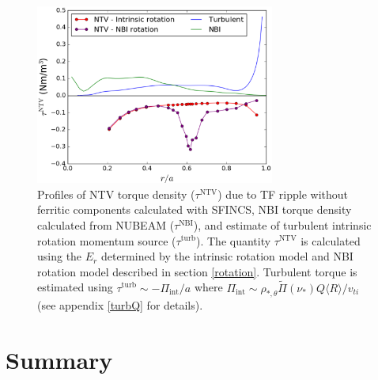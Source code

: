 \documentclass[aip, pop, preprint]{revtex4-1}
\begin{document}
\begin{figure}[h!]
\centering
\includegraphics[width=0.7\textwidth]{figure10.eps}
\caption{\label{fig:alltorque} Profiles of NTV torque density ($\tau^{\mathrm{NTV}}$) due to TF ripple without ferritic components calculated with SFINCS, NBI torque density calculated from NUBEAM ($\tau^{\mathrm{NBI}}$), and estimate of turbulent intrinsic rotation momentum source ($\tau^{\mathrm{turb}}$). The quantity $\tau^{\mathrm{NTV}}$ is calculated using the $E_r$ determined by the intrinsic rotation model and NBI rotation model described in section \ref{rotation}. Turbulent torque is estimated using $\tau^{\mathrm{turb}} \sim -\Pi_{\mathrm{int}}/a$ where $\Pi_{\mathrm{int}} \sim \rho_{*, \theta} \widetilde{\Pi}(\nu_*) Q \langle R \rangle/v_{ti}$ (see appendix \ref{turbQ} for details).}
\end{figure}

\section{Summary}\label{summary}
\end{document}
